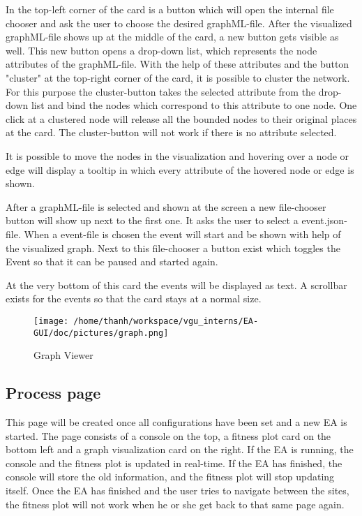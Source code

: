 \documentclass[11pt,a4paper]{article}
\begin{document}
In the top-left corner of the card is a button which will open the internal file chooser and ask the user
to choose the desired graphML-file. After the visualized graphML-file shows up at the middle of the card, a new button gets visible as well. This new button opens a drop-down list, which represents the node attributes of the graphML-file. With the help of these attributes and the button "cluster" at the top-right corner of the card, it is possible to cluster the network. For this purpose the cluster-button takes the selected attribute from the drop-down list and bind the nodes which correspond to this attribute to one node. One click at a clustered node will release all the bounded nodes to their original places at the card. The cluster-button will not work if there is no attribute selected.

It is possible to move the nodes in the visualization and hovering over a node or edge will display a tooltip in which every attribute of the hovered node or edge is shown.  

After a graphML-file is selected and shown at the screen a new file-chooser button will show up next to the first one. It asks the user to select a event.json-file. When a event-file is chosen the event will start and be shown with help of the visualized graph. Next to this file-chooser a button exist which toggles the Event so that it can be paused and started again.

At the very bottom of this card the events will be displayed as text. A scrollbar exists for the events so that the card stays at a normal size.    

\begin{figure}[htp]
\centering
\texttt{[image: /home/thanh/workspace/vgu\_interns/EA-GUI/doc/pictures/graph.png]}
\caption{Graph Viewer}
\label{}
\end{figure}

\subsection{Process page}
This page will be created once all configurations have been set and a new EA is started. The page consists of a console on the top, a fitness plot card on the bottom left and a graph visualization card on the right. If the EA is running, the console and the fitness plot is updated in real-time. If the EA has finished, the console will store the old information, and the fitness plot will stop updating itself. Once the EA has finished and the user tries to navigate between the sites, the fitness plot will not work when he or she get back to that same page again.
\end{document}
